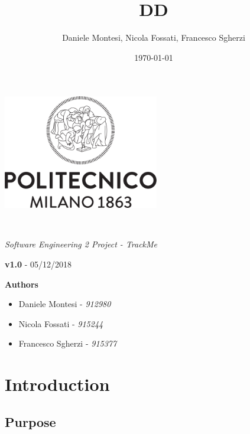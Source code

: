 \documentclass[a4paper,oneside,11pt]{article}
\title{DD}
\author{Daniele Montesi, Nicola Fossati, Francesco Sgherzi}
\date{\today}
\begin{document}
    \begin{titlingpage} 
        \begin{center}
            \includegraphics[height=5cm]{assets/Logo_Politecnico_Milano.png}\\
            \vspace{4cm}
            \begin{huge} 
                \textbf{\thetitle} \\
            \end{huge}
            \vspace{0.3cm}
                    \begin{Large}
                \textit{Software Engineering 2 Project - TrackMe} \\
            \end{Large}
        \end{center}
         \textbf{v1.0} - 05/12/2018 \\

            \vspace{4cm}
             \begin{large}
            \textbf{Authors}
            \begin{itemize}
                \item Daniele Montesi - \textit{912980} 
                \item Nicola Fossati - \textit{915244}
                \item Francesco Sgherzi - \textit{915377}
            \end{itemize}
        \end{large}
    \end{titlingpage}
    \newpage
    \tableofcontents
    \newpage
    \section{Introduction}
    
        \subsection{Purpose}
            
\end{document}
